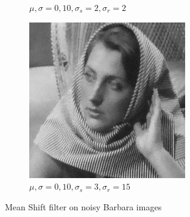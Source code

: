 \documentclass[a4paper, landscape]{article}
\begin{document}
\begin{figure}
\begin{subfigure}{0.33\linewidth}
        \caption{$\mu, \sigma = 0, 10, \sigma_s=2, \sigma_r=2$}
    \end{subfigure}
    \begin{subfigure}{0.33\linewidth}
        \centering
        \includegraphics[width=\linewidth]{barbara256,σ_noise10,σ_spatial3,σ_range15.png}
        \caption{$\mu, \sigma = 0, 10, \sigma_s=3, \sigma_r=15$}
    \end{subfigure}
    \caption{Mean Shift filter on noisy Barbara images}
    \label{fig:bn}
\end{figure}
\end{document}
